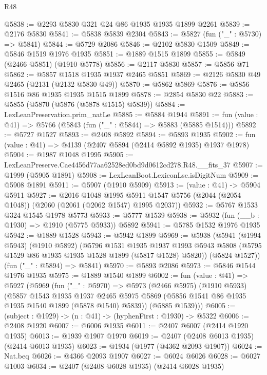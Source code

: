 \begin{lexlean}{R48}
\begin{coremodule}
@5838 := @2293 @5830 @321 @24 @86 @1935 @1935 @1899 @2261
@5839 := @2176 @5830
@5841 := @5838 @5839 @2304
@5843 := @5827 (fun ("_" : @5730) => @5841)
@5844 := @5729 @2086
@5846 := @2102 @5830 @1509
@5849 := @5846 @1519 @1976 @1935
@5851 := @1889 @1515 @1899
@5855 := @5849 (@2466 @5851) (@1910 @5778)
@5856 := @2117 @5830
@5857 := @5856 @71
@5862 := @5857 @1518 @1935 @1937 @2465 @5851
@5869 := @2126 @5830 @49 @2465 (@2131 (@2132 @5830 @49))
@5870 := @5862 @5869
@5876 := @5856 @1516 @86 @1935 @1935 @1515 @1899
@5878 := @2854 @5830 @22
@5883 := @5855 (@5870 (@5876 (@5878 @1515) @5839))
@5884 := LexLeanPreservation.prim_natLe
@5885 := @5884 @1944
@5891 := fun (value : @41) => @5766 (@5843 (fun ("_" : @5844) => @5883 (@5885 @1514)))
@5892 := @5727 @1527
@5893 := @2408 @5892
@5894 := @5893 @1935
@5902 := fun (value : @41) => @4139 (@2407 @5894 (@2414 @5892 @1935) @1937 @1978)
@5904 := @1987 @1048 @1995
@5905 := LexLeanPreserve.Cae4456d77aa62528ed0bd9d0612cd278.R48.__fits_37
@5907 := @1999 (@5905 @1891)
@5908 := LexLeanBoot.LexiconLse.isDigitNum
@5909 := @5908 @1891
@5911 := @5907 (@1910 @5909)
@5913 := (value : @41) -> @5904 @5911
@5927 := @2016
    @1048
    @1995
    @5911
    @1547
    @5756
    (@2044 (@2054 @1048))
    (@2060 (@2061 (@2062 @1547) @1995 @2037))
@5932 := @5767 @1533 @324 @1545 @1978 @5773
@5933 := @5777 @1539
@5938 := @5932 (fun (__b : @1930) => @1910 (@5775 @5933)) @5892
@5941 := @5785 @1532 @1976 @1935
@5942 := @1889 @1528
@5943 := @5942 @1899
@5969 := @5938
    (@5941
      (@1994 @5943)
      (@1910 @5892)
      (@5796
        @1531
        @1935
        @1937
        @1993
        @5943
        @5808
        (@5795 @1529 @86 @1935 @1935 @1528 @1899 (@5817 @1528) @5820))
      (@5824 @1527))
    (fun ("_" : @5894) => @5841)
@5970 := @5893 @2086
@5973 := @5846 @1544 @1976 @1935
@5975 := @1889 @1540 @1899
@6002 := fun (value : @41) =>
  @5927
    (@5969
      (fun ("_" : @5970) =>
      @5973
        (@2466 @5975)
        (@1910 @5933)
        (@5857
          @1543
          @1935
          @1937
          @2465
          @5975
          @5869
          (@5856 @1541 @86 @1935 @1935 @1540 @1899 (@5878 @1540) @5839))
        (@5885 @1539)))
@6005 := (subject : @1929) -> (n : @41) -> (hyphenFirst : @1930) -> @5322
@6006 := @2408 @1920
@6007 := @6006 @1935
@6011 := @2407 @6007 (@2414 @1920 @1935)
@6013 := @1939 @1907 @1970
@6019 := @2407 (@2408 @6013 @1935) (@2414 @6013 @1935)
@6023 := @1934 (@1977 (@4362 @2093 @1907))
@6024 := Nat.beq
@6026 := @4366 @2093 @1907
@6027 := @6024 @6026
@6028 := @6027 @1003
@6034 := @2407 (@2408 @6028 @1935) (@2414 @6028 @1935)

\end{coremodule}
\end{lexlean}
